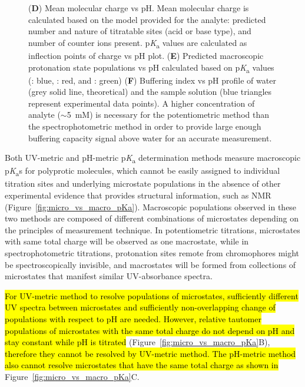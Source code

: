 \documentclass[9pt,lineno]{elife}
\newcommand{\pKa}{p\textit{K}\textsubscript{a}}
\begin{document}
\begin{figure}
{(\textbf{D}) Mean molecular charge vs pH. 
Mean molecular charge is calculated based on the model provided for the analyte: predicted number and nature of titratable sites (acid or base type), and number of counter ions present. 
\pKa{} values are calculated as inflection points of charge vs pH plot. 
(\textbf{E}) Predicted macroscopic protonation state populations vs pH calculated based on \pKa{} values (: blue, : red, and : green) 
(\textbf{F}) Buffering index vs pH profile of water (grey solid line, theoretical) and the sample solution (blue triangles represent experimental data points). 
A higher concentration of analyte ($\sim$5~mM) is necessary for the potentiometric method than the spectrophotometric method in order to provide large enough buffering capacity signal above water for an accurate measurement. 
}
\label{fig:UVmetric_vs_pHmetric_pKa}
\end{figure}

Both UV-metric and pH-metric \pKa{} determination methods measure macroscopic \pKa{}s for polyprotic molecules, which cannot be easily assigned to individual titration sites and underlying microstate populations in the absence of other experimental evidence that provides structural information, such as NMR (Figure~\ref{fig:micro_vs_macro_pKa}). 
Macroscopic populations observed in these two methods are composed of different combinations of microstates depending on the principles of measurement technique. 
In potentiometric titrations, microstates with same total charge will be observed as one macrostate, while in spectrophotometric titrations, protonation sites remote from chromophores might be spectroscopically invisible, and macrostates will be formed from collections of microstates that manifest similar UV-absorbance spectra.

\hl{For UV-metric method to resolve populations of microstates, sufficiently different UV spectra between microstates and sufficiently non-overlapping change of populations with respect to pH are needed. However, relative tautomer populations of microstates with the same total charge do not depend on pH and stay constant while pH is titrated} (Figure~\ref{fig:micro_vs_macro_pKa}B), \hl{therefore they cannot be resolved by UV-metric method. The pH-metric method also cannot resolve microstates that have the same total charge as shown in} Figure~\ref{fig:micro_vs_macro_pKa}C.
\end{document}
